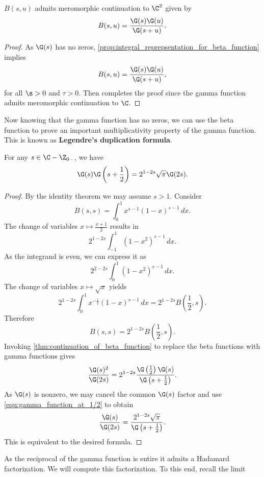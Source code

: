   \begin{theorem}\label{thm:continuation_of_beta_function}
    \(B(s,u)\) admits meromorphic continuation to \(\C^{2}\) given by
    \[
      B(s,u) = \frac{\G(s)\G(u)}{\G(s+u)}.
    \]
  \end{theorem}
  \begin{proof}
    As \(\G(s)\) has no zeros, \cref{prop:integral_reprepsentation_for_beta_function} implies
    \[
      B(s,u) = \frac{\G(s)\G(u)}{\G(s+u)},
    \]
    for all \(\s > 0\) and \(\tau > 0\). Then completes the proof since the gamma function admits meromorphic continuation to \(\C\).
  \end{proof}

  Now knowing that the gamma function has no zeros, we can use the beta function to prove an important multiplicativity property of the gamma function. This is known as \textbf{Legendre's duplication formula}.

  \begin{theorem*}
    For any \(s \in \C-\Z_{0-}\), we have
    \[
      \G(s)\G\left(s+\frac{1}{2}\right) = 2^{1-2s}\sqrt{\pi}\G(2s).
    \]
  \end{theorem*}
  \begin{proof}
    By the identity theorem we may assume \(s > 1\). Consider
    \[
      B(s,s) = \int_{0}^{1}x^{s-1}(1-x)^{s-1}\,dx.
    \]
    The change of variables \(x \mapsto \frac{x+1}{2}\) results in
    \[
      2^{1-2s}\int_{-1}^{1}(1-x^{2})^{s-1}\,dx.
    \]
    As the integrand is even, we can express it as
    \[
      2^{2-2s}\int_{0}^{1}(1-x^{2})^{s-1}\,dx.
    \]
    The change of variables \(x \mapsto \sqrt{x}\) yields
    \[
      2^{1-2s}\int_{0}^{1}x^{-\frac{1}{2}}(1-x)^{s-1}\,dx = 2^{1-2s}B\left(\frac{1}{2},s\right).
    \]
    Therefore
    \[
      B(s,s) = 2^{1-2s}B\left(\frac{1}{2},s\right).
    \]
    Invoking \cref{thm:continuation_of_beta_function} to replace the beta functions with gamma functions gives
    \[
      \frac{\G(s)^{2}}{\G(2s)} = 2^{1-2s}\frac{\G\left(\frac{1}{2}\right)\G(s)}{\G\left(s+\frac{1}{2}\right)}.
    \]
    As \(\G(s)\) is nonzero, we may cancel the common \(\G(s)\) factor and use \cref{equ:gamma_function_at_1/2} to obtain
    \[
      \frac{\G(s)}{\G(2s)} = \frac{2^{1-2s}\sqrt{\pi}}{\G\left(s+\frac{1}{2}\right)}.
    \]
    This is equivalent to the desired formula.
  \end{proof}

  As the reciprocal of the gamma function is entire it admits a Hadamard factorization. We will compute this factorization. To this end, recall the limit

